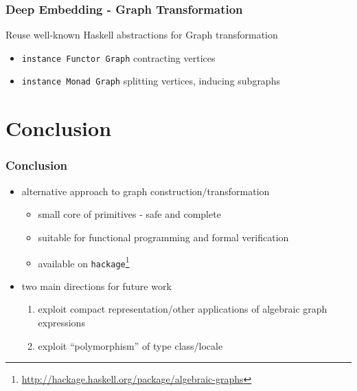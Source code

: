 \documentclass{beamer}
\newcommand{\hs}{\texttt}
\begin{document}
\begin{frame}
  \frametitle{Deep Embedding - Graph Transformation}
  \onslide<+->
  \begin{alertblock}{Reuse well-known Haskell abstractions for Graph
      transformation}
    \begin{itemize}[<+->]
    \item \hs{instance Functor Graph} \textrightarrow{} contracting vertices
    \item \hs{instance Monad Graph} \textrightarrow{} splitting vertices,
      inducing subgraphs
    \end{itemize}
  \end{alertblock}
\end{frame}

\section{Conclusion}
\begin{frame}
  \frametitle{Conclusion}
  \begin{alertblock}{}
    \begin{itemize}
    \item<+-> alternative approach to graph construction/transformation
      \begin{itemize}
      \item small core of primitives - safe and complete
      \item suitable for functional programming and formal verification
      \item available on \texttt{hackage}\footnote{\href{http://hackage.haskell.org/package/algebraic-graphs}{http://hackage.haskell.org/package/algebraic-graphs}}
    \end{itemize}
  \item<+-> two main directions for future work
    \begin{enumerate}
    \item exploit compact representation/other applications of algebraic graph
      expressions
    \item exploit ``polymorphism'' of type class/locale
    \end{enumerate}
  \end{itemize}
  \end{alertblock}
\end{frame}
\end{document}
